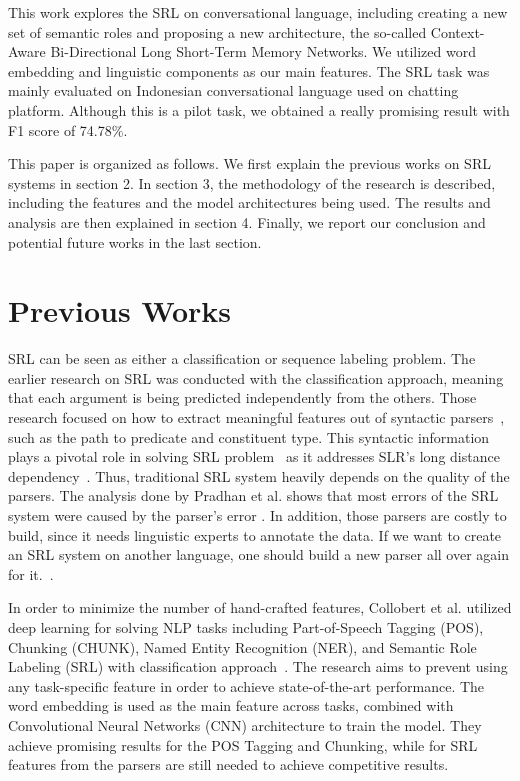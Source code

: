 This work explores the SRL on conversational language, including creating a new set of semantic roles and proposing a new architecture, the so-called Context-Aware Bi-Directional Long Short-Term Memory Networks. We utilized word embedding and linguistic components as our main features. The SRL task was mainly evaluated on Indonesian conversational language used on chatting platform. Although this is a pilot task, we obtained a really promising result with F1 score of 74.78\%.

This paper is organized as follows. We first explain the previous works on SRL systems in section 2. In section 3, the methodology of the research is described, including the features and the model architectures being used. The results and analysis are then explained in section 4. Finally, we report our conclusion and potential future works in the last section.

\section{Previous Works}
SRL can be seen as either a classification or sequence labeling problem. The earlier research on SRL was conducted with the classification approach, meaning that each argument is being predicted independently from the others. Those research focused on how to extract meaningful features out of syntactic parsers~\cite{gildea2002automatic, gildea2002necessity, pradhan2005semantic}, such as the path to predicate and constituent type. This syntactic information plays a pivotal role in solving SRL problem~\cite{punyakanok2008importance} as it addresses SLR's long distance dependency~\cite{zhou2015end}. Thus, traditional SRL system heavily depends on the quality of the parsers. The analysis done by Pradhan et al. shows that most errors of the SRL system were caused by the parser's error \cite{pradhan2005semantic}. In addition, those parsers are costly to build, since it needs linguistic experts to annotate the data. If we want to create an SRL system on another language, one should build a new parser all over again for it.~\cite{zhou2015end}.

In order to minimize the number of hand-crafted features, Collobert et al. utilized deep learning for solving NLP tasks including Part-of-Speech Tagging (POS), Chunking (CHUNK), Named Entity Recognition (NER), and Semantic Role Labeling (SRL) with classification approach~\cite{collobert2011natural}. The research aims to prevent using any task-specific feature in order to achieve state-of-the-art performance. The word embedding is used as the main feature across tasks, combined with Convolutional Neural Networks (CNN) architecture to train the model. They achieve promising results for the POS Tagging and Chunking, while for SRL features from the parsers are still needed to achieve competitive results.

